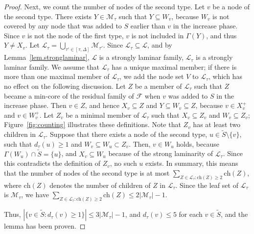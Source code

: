 \documentclass[11pt]{article}
\newcommand{\Ffam}{\mathcal{F}}
\newcommand{\Mfam}{\mathcal{M}}
\newcommand{\Lfam}{\mathcal{L}}
\begin{document}
\begin{proof}
  Next, we count the number of nodes of the second type.
   Let $v$ be a node of the second type.
   There exists $Y \in \Mfam_{\tau}$
   such that  $Y \subseteq W_v$, because $W_v$ is not covered by
   any node that was added to $S$ earlier than $v$ in the increase phase.
   Since $v$ is not the node of the first type,
   $v$ is not included in $\Gamma(Y)$, and thus $Y \neq X_v$.
   Let $\Lfam_{\tau}=\bigcup_{\tau' \in [\tau,\Delta]}\Mfam_{\tau'}$.
   Since
   $\Lfam_{\tau} \subseteq \Lfam$, and by Lemma~\ref{lem.stronglaminar},
   $\Lfam$ is a strongly laminar family,
   $\Lfam_{\tau}$ is a strongly laminar family.
   We assume that $\Lfam_{\tau}$ has a unique maximal member;
   if
   there is more than one maximal member of 
   $\Lfam_{\tau}$, we add the node set $V$ to $\Lfam_{\tau}$, which has
   no effect on the following discussion.
   Let $Z$ be a member of $\Lfam_{\tau}$ such that $Z$ became a
   min-core of the residual family of $\Ffam$ when $v$ was added to $S$
   in the increase phase.
   Then $v \in Z$, and hence $X_v \subseteq Z$ and $Y \subseteq
   W_v\subseteq Z$,
   because $v \in X^+_v$ and $v \in W^+_v$.
   Let $Z_v$ be a minimal member of $\Lfam_{\tau}$ such that $X_v
   \subseteq Z_v$ and $W_v \subseteq Z_v$;
   Figure~\ref{fig:counting} illustrates these definitions.
   Note that $Z_v$ has at least two children in $\Lfam_{\tau}$.
   Suppose that there exists a node of the second type, $u \in \tilde{S}\setminus \{v\}$,
   such that $d_{\tau}(u)\geq 1$ and   
   $W_v \subseteq W_u \subset Z_v$.
   Then,
   $v \in W_u$ holds, because $\Gamma(W_u) \cap \tilde{S}=\{u\}$,
   and $X_v \subseteq W_u$ because of the strong laminarity of
   $\Lfam_{\tau}$.
   Since this contradicts the
   definition of $Z_v$,
   no such $u$ exists.
   In summary, this means that
   the number of nodes of the second type
   is at most $\sum_{Z \in \Lfam_{\tau}: \text{ch}(Z)\geq 2} \text{ch}(Z)$,
   where $\text{ch}(Z)$ denotes the number of children of $Z$ in
   $\Lfam_{\tau}$.
   Since the leaf set of $\Lfam_{\tau}$ is $\Mfam_{\tau}$,
   we have $\sum_{Z \in \Lfam_{\tau}: \text{ch}(Z)\geq 2} \text{ch}(Z) \leq 2|\Mfam_{\tau}|-1$.

    Thus, $|\{v \in \tilde{S} \colon d_{\tau}(v) \geq 1\}| \leq  3|\Mfam_{\tau}|-1$,
   and $d_{\tau}(v) \leq 5$ for each $v \in \tilde{S}$, and the lemma has been proven.
  \end{proof} 
\end{document}
